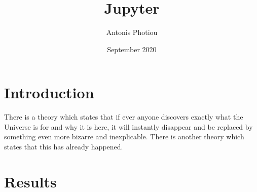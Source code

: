 \documentclass{article}
\title{Jupyter}
\author{Antonis Photiou}
\date{September 2020}
\begin{document}
\maketitle

\section{Introduction}
There is a theory which states that if ever anyone discovers exactly what the Universe is for and why it is here, it will instantly disappear and be replaced by something even more bizarre and inexplicable.
There is another theory which states that this has already happened.

\section{Results}




\end{document}
